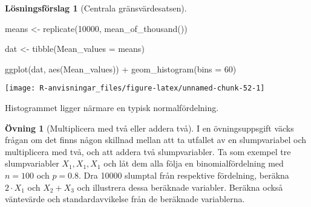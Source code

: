 \documentclass[
]{book}
\newenvironment{Shaded}{\begin{snugshade}}{\end{snugshade}}
\newcommand{\AttributeTok}[1]{\textcolor[rgb]{0.77,0.63,0.00}{#1}}
\newcommand{\DecValTok}[1]{\textcolor[rgb]{0.00,0.00,0.81}{#1}}
\newcommand{\FunctionTok}[1]{\textcolor[rgb]{0.00,0.00,0.00}{#1}}
\newcommand{\NormalTok}[1]{#1}
\newcommand{\OtherTok}[1]{\textcolor[rgb]{0.56,0.35,0.01}{#1}}
\newcommand{\SpecialCharTok}[1]{\textcolor[rgb]{0.00,0.00,0.00}{#1}}
\theoremstyle{definition}
\theoremstyle{definition}
\theoremstyle{definition}
\newtheorem{exercise}{Övning}[chapter]
\theoremstyle{definition}
\newtheorem{hypothesis}{Lösningsförslag}[chapter]
\theoremstyle{remark}
\begin{document}
\begin{hypothesis}[Centrala gränsvärdesatsen]
\begin{Shaded}
\begin{Highlighting}[]
\NormalTok{means }\OtherTok{\textless{}{-}} \FunctionTok{replicate}\NormalTok{(}\DecValTok{10000}\NormalTok{, }\FunctionTok{mean\_of\_thousand}\NormalTok{())}

\NormalTok{dat }\OtherTok{\textless{}{-}} \FunctionTok{tibble}\NormalTok{(}\AttributeTok{Mean\_values =}\NormalTok{ means)}

\FunctionTok{ggplot}\NormalTok{(dat, }\FunctionTok{aes}\NormalTok{(Mean\_values)) }\SpecialCharTok{+}
  \FunctionTok{geom\_histogram}\NormalTok{(}\AttributeTok{bins =} \DecValTok{60}\NormalTok{)}
\end{Highlighting}
\end{Shaded}

\begin{center}\texttt{[image: R-anvisningar\_files/figure-latex/unnamed-chunk-52-1]} \end{center}

Histogrammet ligger närmare en typisk normalfördelning.
\end{hypothesis}

\begin{exercise}[Multiplicera med två eller addera två]
I en övningsuppsgift väcks frågan om det finns någon skillnad mellan att ta utfallet av en slumpvariabel och multiplicera med två, och att addera två slumpvariabler. Ta som exempel tre slumpvariabler \(X_1, X_1, X_1\) och låt dem alla följa en binomialfördelning med \(n = 100\) och \(p = 0.8\). Dra 10000 slumptal från respektive fördelning, beräkna \(2 \cdot X_1\) och \(X_2 + X_3\) och illustrera dessa beräknade variabler. Beräkna också väntevärde och standardavvikelse från de beräknade variablerna.
\end{exercise}
\end{document}
